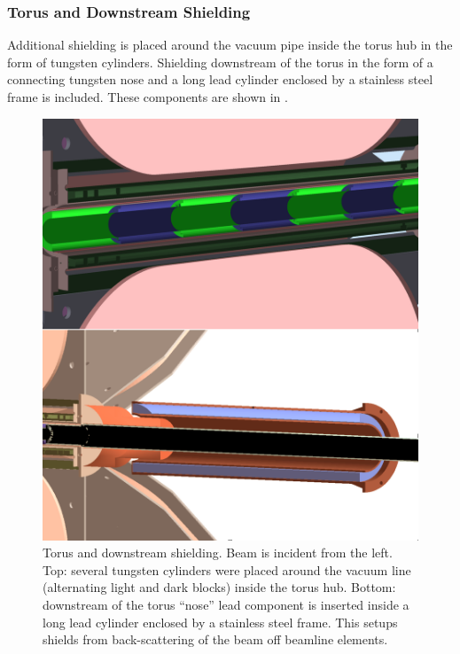 \subsubsection{Torus and Downstream Shielding}
Additional shielding is placed around the vacuum pipe inside the torus hub in the form of tungsten cylinders.
Shielding downstream of the torus in the form of a connecting tungsten nose and a long lead cylinder enclosed
by a stainless steel frame is included. These components are shown in .

\begin{figure}
	\centering
	\includegraphics[width=0.98\columnwidth,keepaspectratio]{img/downstreamShielding.png}
	\caption{Torus and downstream shielding. Beam is incident from the left. Top: several tungsten cylinders were placed around the vacuum line
			 (alternating light and dark blocks) inside the torus hub.
             Bottom: downstream of the torus ``nose'' lead component is inserted inside a long lead cylinder enclosed by a stainless steel
			 frame. This setups shields from back-scattering of the beam off beamline elements. }
	\label{fig:downstreamShielding}
\end{figure}

